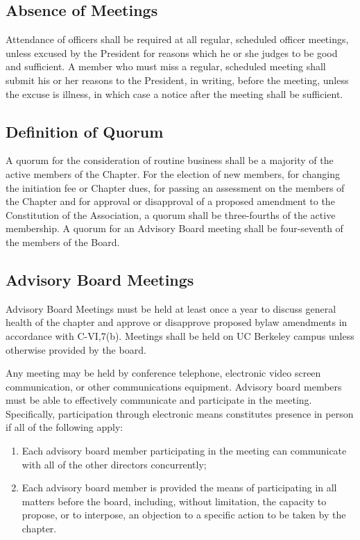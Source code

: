 \documentclass{article}
\begin{document}
	\subsection{Absence of Meetings}
	Attendance of officers shall be required at all regular, scheduled officer meetings, unless excused by the President for reasons which he or she judges to be good and sufficient. A member who must miss a regular, scheduled meeting shall submit his or her reasons to the President, in writing, before the meeting, unless the excuse is illness, in which case a notice after the meeting shall be sufficient.
	
	\subsection{Definition of Quorum}
	A quorum for the consideration of routine business shall be a majority of the active members of the Chapter. For the election of new members, for changing the initiation fee or Chapter dues, for passing an assessment on the members of the Chapter and for approval or disapproval of a proposed amendment to the Constitution of the Association, a quorum shall be three-fourths of the active membership. A quorum for an Advisory Board meeting shall be four-seventh of the members of the Board.
	
	\subsection{Advisory Board Meetings}
	Advisory Board Meetings must be held at least once a year to discuss general health of the chapter and approve or disapprove proposed bylaw amendments in accordance with C-VI,7(b). Meetings shall be held on UC Berkeley campus unless otherwise provided by the board.
	
	Any meeting may be held by conference telephone, electronic video screen communication, or other communications equipment. Advisory board members must be able to effectively communicate and participate in the meeting. Specifically, participation through electronic means constitutes presence in person if all of the following apply:
	\begin{enumerate}[\indent (a)]
		\item Each advisory board member participating in the meeting can communicate with all of the other directors concurrently;
		\item	Each advisory board member is provided the means of participating in all matters before the board, including, without limitation, the capacity to propose, or to interpose, an objection to a specific action to be taken by the chapter.
	\end{enumerate}
	
\end{document}

